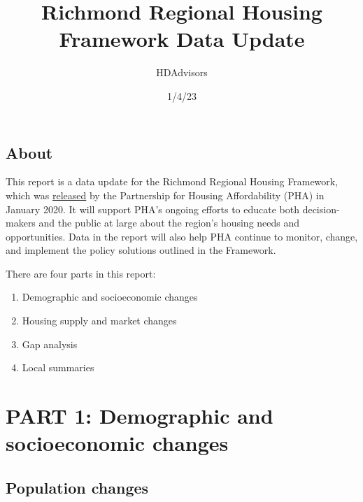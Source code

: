 \documentclass[
  letterpaper,
  DIV=11,
  numbers=noendperiod]{scrreprt}
\title{Richmond Regional Housing Framework Data Update}
\author{HDAdvisors}
\date{1/4/23}
\providecommand{\tightlist}{%
  \setlength{\itemsep}{0pt}\setlength{\parskip}{0pt}}\usepackage{longtable,booktabs,array}
\renewcommand*\contentsname{Table of contents}
\newcommand\contentsname{Table of contents}
\begin{document}
\maketitle
\ifdefined\Shaded\renewenvironment{Shaded}{\begin{tcolorbox}[borderline west={3pt}{0pt}{shadecolor}, breakable, enhanced, interior hidden, sharp corners, frame hidden, boxrule=0pt]}{\end{tcolorbox}}\fi

\renewcommand*\contentsname{Table of contents}
{
\hypersetup{linkcolor=}
\setcounter{tocdepth}{2}
\tableofcontents
}

\hypertarget{about}{%
\chapter*{About}\label{about}}


This report is a data update for the Richmond Regional Housing
Framework, which was
\href{https://pharva.com/framework/about-the-framework/}{released} by
the Partnership for Housing Affordability (PHA) in January 2020. It will
support PHA's ongoing efforts to educate both decision-makers and the
public at large about the region's housing needs and opportunities. Data
in the report will also help PHA continue to monitor, change, and
implement the policy solutions outlined in the Framework.

There are four parts in this report:

\begin{enumerate}
\def\labelenumi{\arabic{enumi}.}
\tightlist
\item
  Demographic and socioeconomic changes
\item
  Housing supply and market changes
\item
  Gap analysis
\item
  Local summaries
\end{enumerate}

\part{PART 1: Demographic and socioeconomic changes}

\hypertarget{part-1-1}{%
\chapter{Population changes}\label{part-1-1}}
\end{document}
